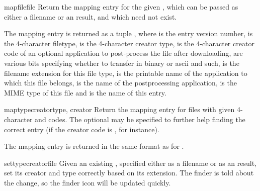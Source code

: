 \begin{methoddesc}{mapfile}{file}
Return the mapping entry for the given , which can be passed
as either a filename or an  result, and which
need not exist.

The mapping entry is returned as a tuple , where  is the entry version
number,  is the 4-character filetype,  is the
4-character creator type,  is the 4-character creator
code of an
optional application to post-process the file after downloading,
 are various bits specifying whether to transfer in binary
or ascii and such,  is the filename extension for this
file type,  is the printable name of the application to
which this file belongs,  is the name of the
postprocessing application,  is the MIME type of this
file and  is the name of this entry.
\end{methoddesc}

\begin{methoddesc}{maptypecreator}{type, creator}
Return the mapping entry for files with given 4-character  and
 codes. The optional  may be specified to
further help finding the correct entry (if the creator code is
, for instance).

The mapping entry is returned in the same format as for .
\end{methoddesc}

\begin{methoddesc}{settypecreator}{file}
Given an existing , specified either as a filename or as an
 result, set its creator and type correctly based
on its extension.  The finder is told about the change, so the finder
icon will be updated quickly.
\end{methoddesc}
